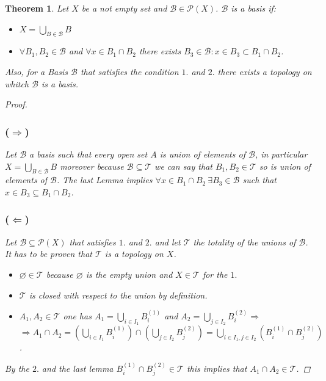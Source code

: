 \documentclass{article}
\newtheorem{theorem}{Theorem}
\begin{document}
    \begin{theorem}
        Let $X$ be a not empty set and $\mathcal{B} \in \mathcal{P}(X)$. $\mathcal{B}$ is a basis if:
        \begin{itemize}
            \item[$1.$] $X = \bigcup_{B\in \mathcal{B}}B$
            \item[$2.$] $\forall B_1, B_2 \in \mathcal{B}$ and $\forall x \in B_1 \cap B_2$ there exists $B_3 \in \mathcal{B} : x\in B_3 \subset B_1\cap B_2 $. 
        \end{itemize}
        Also, for a Basis $\mathcal{B}$ that satisfies the condition $1.$ and $2.$ there exists a topology on whitch $\mathcal{B}$ is a basis.
        \begin{proof}
            \subsubsection*{($\Rightarrow$)}
                Let $\mathcal{B}$ a basis such that every open set $A$ is union of elements of $\mathcal{B}$, in particular $X = \bigcup_{B\in \mathcal{B}}B$ moreover because $\mathcal{B} \subseteq \mathcal{T}$ we can say that $B_1,B_2 \in \mathcal{T}$ so is union of elements of $\mathcal{B}$. The last Lemma implies $\forall x \in B_1\cap B_2 \ \exists B_3 \in \mathcal{B}$ such that $x\in B_3 \subseteq B_1 \cap B_2$.
            \subsubsection*{($\Leftarrow$)}
                Let $\mathcal{B} \subseteq \mathcal{P}(X)$ that satisfies $1.$ and $2.$ and let $\mathcal{T}$ the totality of the unions of $\mathcal{B}$. It has to be proven that $\mathcal{T}$ is a topology on $X$.
                \begin{itemize}
                    \item[i] $\varnothing \in \mathcal{T}$ because $\varnothing$ is the empty union and $X \in \mathcal{T}$ for the $1.$
                    \item[ii] $\mathcal{T}$ is closed with respect to the union by definition.
                    \item[iii] $A_1,A_2 \in \mathcal{T}$ one has $A_1 = \bigcup_{i \in I_1}B_i^{(1)}$ and $A_2 = \bigcup_{j\in I_2}B_i^{(2)} \Rightarrow$ \\ $ \Rightarrow  A_1\cap A_2 = \left( \bigcup_{i \in I_1}B_i^{(1)} \right) \cap \left( \bigcup_{j \in I_2}B_j^{(2)} \right) = \bigcup_{i \in I_1, j \in I_2} \left( B_i^{(1)} \cap B_j^{(2)} \right)$.  
                \end{itemize} 
                By the $2.$ and the last lemma $ B_i^{(1)} \cap B_j^{(2)} \in \mathcal{T}$ this implies that $A_1 \cap A_2 \in \mathcal{T}$.
        \end{proof}
    \end{theorem}
\end{document}
